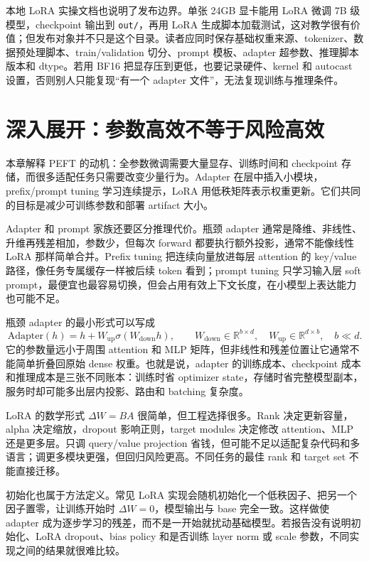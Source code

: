 \documentclass[UTF8,zihao=-4,openany]{ctexbook}
\begin{document}
本地 LoRA 实操文档也说明了发布边界。单张 24GB 显卡能用 LoRA 微调 7B 级模型，checkpoint 输出到 \texttt{out/}，再用 LoRA 生成脚本加载测试，这对教学很有价值；但发布对象并不只是这个目录。读者应同时保存基础权重来源、tokenizer、数据预处理脚本、train/validation 切分、prompt 模板、adapter 超参数、推理脚本版本和 dtype。若用 BF16 把显存压到更低，也要记录硬件、kernel 和 autocast 设置，否则别人只能复现“有一个 adapter 文件”，无法复现训练与推理条件。

\section{深入展开：参数高效不等于风险高效}
本章解释 PEFT 的动机：全参数微调需要大量显存、训练时间和 checkpoint 存储，而很多适配任务只需要改变少量行为。Adapter 在层中插入小模块，prefix/prompt tuning 学习连续提示，LoRA 用低秩矩阵表示权重更新。它们共同的目标是减少可训练参数和部署 artifact 大小。

Adapter 和 prompt 家族还要区分推理代价。瓶颈 adapter 通常是降维、非线性、升维再残差相加，参数少，但每次 forward 都要执行额外投影，通常不能像线性 LoRA 那样简单合并。Prefix tuning 把连续向量放进每层 attention 的 key/value 路径，像任务专属缓存一样被后续 token 看到；prompt tuning 只学习输入层 soft prompt，最便宜也最容易切换，但会占用有效上下文长度，在小模型上表达能力也可能不足。

瓶颈 adapter 的最小形式可以写成
\[
  \mathrm{Adapter}(h)=h+W_{\mathrm{up}}\sigma(W_{\mathrm{down}}h),
  \qquad
  W_{\mathrm{down}}\in\mathbb R^{b\times d},\quad
  W_{\mathrm{up}}\in\mathbb R^{d\times b},\quad b\ll d.
\]
它的参数量远小于周围 attention 和 MLP 矩阵，但非线性和残差位置让它通常不能简单折叠回原始 dense 权重。也就是说，adapter 的训练成本、checkpoint 成本和推理成本是三张不同账本：训练时省 optimizer state，存储时省完整模型副本，服务时却可能多出层内投影、路由和 batching 复杂度。

LoRA 的数学形式 $\Delta W=BA$ 很简单，但工程选择很多。Rank 决定更新容量，alpha 决定缩放，dropout 影响正则，target modules 决定修改 attention、MLP 还是更多层。只调 query/value projection 省钱，但可能不足以适配复杂代码和多语言；调更多模块更强，但回归风险更高。不同任务的最佳 rank 和 target set 不能直接迁移。

初始化也属于方法定义。常见 LoRA 实现会随机初始化一个低秩因子、把另一个因子置零，让训练开始时 $\Delta W=0$，模型输出与 base 完全一致。这样做使 adapter 成为逐步学习的残差，而不是一开始就扰动基础模型。若报告没有说明初始化、LoRA dropout、bias policy 和是否训练 layer norm 或 scale 参数，不同实现之间的结果就很难比较。
\end{document}
